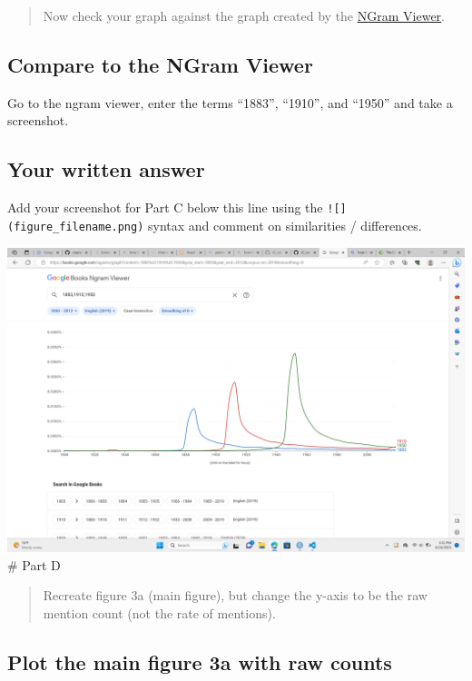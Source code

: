\documentclass[
]{article}
\begin{document}
\begin{quote}
Now check your graph against the graph created by the
\href{https://books.google.com/ngrams/}{NGram Viewer}.
\end{quote}

\hypertarget{compare-to-the-ngram-viewer}{%
\subsection{Compare to the NGram
Viewer}\label{compare-to-the-ngram-viewer}}

Go to the ngram viewer, enter the terms ``1883'', ``1910'', and ``1950''
and take a screenshot.

\hypertarget{your-written-answer-2}{%
\subsection{Your written answer}\label{your-written-answer-2}}

Add your screenshot for Part C below this line using the
\texttt{!{[}{]}(figure\_filename.png)} syntax and comment on
similarities / differences.

\includegraphics{fromWeb.png} \# Part D

\begin{quote}
Recreate figure 3a (main figure), but change the y-axis to be the raw
mention count (not the rate of mentions).
\end{quote}

\hypertarget{plot-the-main-figure-3a-with-raw-counts}{%
\subsection{Plot the main figure 3a with raw
counts}\label{plot-the-main-figure-3a-with-raw-counts}}
\end{document}
